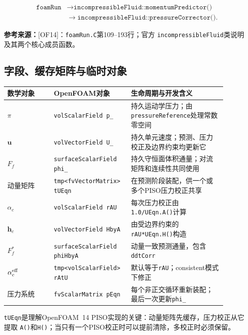 \documentclass[UTF8,12pt,a4paper]{ctexart}
\numberwithin{equation}{section}
\newcommand{\OFfourteen}{\textnormal{[OF14]}}
\newcommand{\source}[1]{\par\smallskip\noindent\colorbox{sourcebg}{%
  \parbox{0.955\linewidth}{\footnotesize\color{sourcegray}\textbf{参考来源：}#1}}\par\smallskip}
\begin{document}
\begin{equation}
  \boxed{\begin{aligned}
  \texttt{foamRun}&\longrightarrow
  \texttt{incompressibleFluid::momentumPredictor()}\\
  &\longrightarrow
  \texttt{incompressibleFluid::pressureCorrector()}.
  \end{aligned}}
  \label{eq:of14_piso_lifecycle}
\end{equation}
\source{\OFfourteen：\texttt{foamRun.C}第109--193行；官方
\texttt{incompressibleFluid}类说明及其两个核心成员函数。}

\subsection{字段、缓存矩阵与临时对象}
\begin{longtable}{p{0.20\linewidth}p{0.28\linewidth}p{0.41\linewidth}}
\toprule
数学对象 & OpenFOAM对象 & 生命周期与开发含义\\
\midrule
$\pi$ & \texttt{volScalarField p\_} & 持久运动学压力；由\texttt{pressureReference}处理常数零空间\\
$\bm u$ & \texttt{volVectorField U\_} & 持久单元速度；预测、压力校正及边界约束均更新它\\
$F_f$ & \texttt{surfaceScalarField phi\_} & 持久守恒面体积通量；对流矩阵和连续性共同使用\\
动量矩阵 & \texttt{tmp<fvVectorMatrix> tUEqn} & 在预测阶段装配，供一个或多个PISO压力校正共享\\
$\alpha_c$ & \texttt{volScalarField rAU} & 每次压力校正由\texttt{1.0/UEqn.A()}计算\\
$\bm h_c$ & \texttt{volVectorField HbyA} & 由受边界约束的\texttt{rAU*UEqn.H()}构造\\
$F_f^*$ & \texttt{surfaceScalarField phiHbyA} & 动量一致预测通量，包含\texttt{ddtCorr}\\
$\alpha_c^{\rm eff}$ & \texttt{tmp<volScalarField> rAtU} & 默认等于\texttt{rAU}；consistent模式下修正\\
压力系统 & \texttt{fvScalarMatrix pEqn} & 每个非正交循环重新装配；最后一次更新\texttt{phi\_}\\
\bottomrule
\end{longtable}
\texttt{tUEqn}是理解OpenFOAM~14 PISO实现的关键：动量矩阵先缓存，压力校正从它提取
\texttt{A()}和\texttt{H()}；当只有一个PISO校正时可以提前清除，多校正时必须保留。
\end{document}
